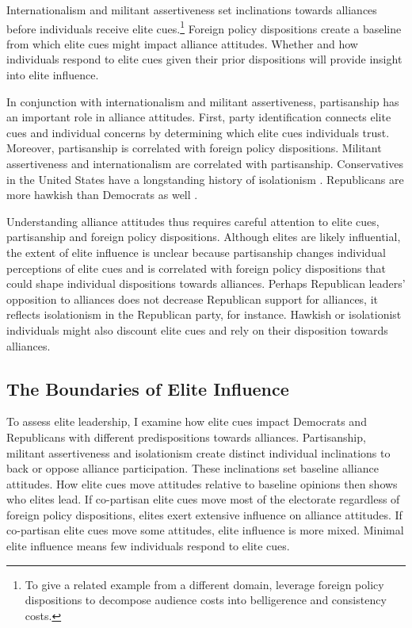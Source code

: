 \documentclass[12pt]{article}
\begin{document}
Internationalism and militant assertiveness set inclinations towards alliances before individuals receive elite cues.\footnote{To give a related example from a different domain, \citet{KertzerBrutger2016} leverage foreign policy dispositions to decompose audience costs into belligerence and consistency costs.}
Foreign policy dispositions create a baseline from which elite cues might impact alliance attitudes. 
Whether and how individuals respond to elite cues given their prior dispositions will provide insight into elite influence. 


In conjunction with internationalism and militant assertiveness, partisanship has an important role in alliance attitudes. 
First, party identification connects elite cues and individual concerns by determining which elite cues individuals trust.
Moreover, partisanship is correlated with foreign policy dispositions. 
Militant assertiveness and internationalism are correlated with partisanship. 
Conservatives in the United States have a longstanding history of isolationism \citep{Kupchan2020}.
Republicans are more hawkish than Democrats as well \citep{Gries2014}. 


Understanding alliance attitudes thus requires careful attention to elite cues, partisanship and foreign policy dispositions. 
Although elites are likely influential, the extent of elite influence is unclear because partisanship changes individual perceptions of elite cues and is correlated with foreign policy dispositions that could shape individual dispositions towards alliances. 
Perhaps Republican leaders' opposition to alliances does not decrease Republican support for alliances, it reflects isolationism in the Republican party, for instance. 
Hawkish or isolationist individuals might also discount elite cues and rely on their disposition towards alliances. 



\subsection{The Boundaries of Elite Influence}


To assess elite leadership, I examine how elite cues impact Democrats and Republicans with different predispositions towards alliances.
Partisanship, militant assertiveness and isolationism create distinct individual inclinations to back or oppose alliance participation. 
These inclinations set baseline alliance attitudes. 
How elite cues move attitudes relative to baseline opinions then shows who elites lead. 
If co-partisan elite cues move most of the electorate regardless of foreign policy dispositions, elites exert extensive influence on alliance attitudes. 
If co-partisan elite cues move some attitudes, elite influence is more mixed. 
Minimal elite influence means few individuals respond to elite cues. 
\end{document}

